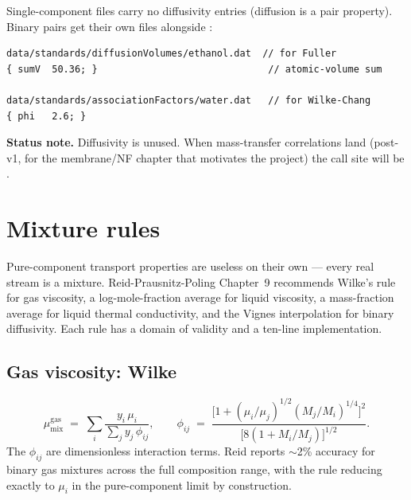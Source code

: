 \documentclass[11pt,a4paper]{article}
\begin{document}
Single-component files carry no diffusivity entries (diffusion is a
pair property).  Binary pairs get their own files alongside
:
\begin{lstlisting}
data/standards/diffusionVolumes/ethanol.dat  // for Fuller
{ sumV  50.36; }                              // atomic-volume sum

data/standards/associationFactors/water.dat   // for Wilke-Chang
{ phi   2.6; }
\end{lstlisting}

\begin{tutoriallink}
\textbf{Status note.}  Diffusivity is unused.  When mass-transfer
correlations land (post-v1, for the membrane/NF chapter that
motivates the project) the call site will be
.
\end{tutoriallink}

\section{Mixture rules}\label{ch:mixture-rules}

\begin{whatyoulllearn}
Pure-component transport properties are useless on their own ---
every real stream is a mixture.  Reid-Prausnitz-Poling Chapter~9
recommends Wilke's rule for gas viscosity, a log-mole-fraction
average for liquid viscosity, a mass-fraction average for liquid
thermal conductivity, and the Vignes interpolation for binary
diffusivity.  Each rule has a domain of validity and a
ten-line implementation.
\end{whatyoulllearn}

\subsection{Gas viscosity: Wilke}

\begin{equation}
   \mu^{\mathrm{gas}}_{\mathrm{mix}} \;=\;
     \sum_i \frac{y_i\,\mu_i}{\sum_j y_j\,\phi_{ij}},
   \qquad
   \phi_{ij} \;=\;
     \frac{\bigl[1 + (\mu_i/\mu_j)^{1/2}(M_j/M_i)^{1/4}\bigr]^2}
          {\bigl[8(1 + M_i/M_j)\bigr]^{1/2}}.
   \label{eq:wilke-rule}
\end{equation}
The $\phi_{ij}$ are dimensionless interaction terms.  Reid reports
$\sim$2\% accuracy for binary gas mixtures across the full
composition range, with the rule reducing exactly to $\mu_i$ in the
pure-component limit by construction.
\end{document}
